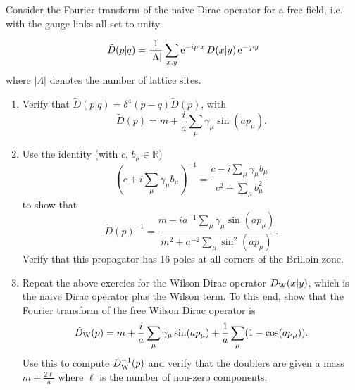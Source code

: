 Consider the Fourier transform of the naive Dirac operator for a free field, i.e. with the gauge links all set to unity 

\begin{equation}
    \tilde{D}(p|q) = \frac{1}{|\Lambda|} \sum_{x,y} {\rm e}^{-ip\cdot x} \, D(x|y) \, {\rm e}^{-q\cdot y} 
\end{equation} 
where $|\Lambda|$ denotes the number of lattice sites.
\begin{enumerate} 
	\item Verify that $\tilde{D}(p|q) = \delta^4(p-q) \tilde{D}(p)$, with 
		\begin{equation}
			\tilde{D}(p) = m + \frac{i}{a} \sum_{\mu} \gamma_\mu \sin(ap_\mu).  
		\end{equation}
	\item Use the identity (with $c,\, b_{\mu} \in \mathbb{R}$) 
		\begin{equation}
			\left( c + i\sum_{\mu} \gamma_\mu b_\mu \right)^{-1} = \frac{c - i\sum_\mu \gamma_\mu b_{\mu}}{c^2 + \sum_\mu b_\mu^2} 
		\end{equation}
		to show that 
		\begin{equation}
			\tilde{D}(p)^{-1} = \frac{m - ia^{-1}\sum_{\mu} \gamma_\mu \sin(ap_{\mu})}{m^2 + a^{-2}\sum_\mu \sin^{2}(ap_{\mu})}. 
		\end{equation}
    Verify that this propagator has 16 poles at all corners of the Brilloin zone.
    \item Repeat the above exercies for the Wilson Dirac operator $D_{\rm W}(x|y)$, which is the naive Dirac operator plus the Wilson term. To this end, show that the Fourier transform of the free Wilson Dirac operator is 
	    \begin{equation}
		    \tilde{D}_{\rm W}(p) = m + \frac{i}{a}\sum_{\mu} \gamma_{\mu}\sin(ap_\mu) + 
		    \frac{1}{a} \sum_{\mu} (1 - \cos(ap_\mu)). 
	    \end{equation}
		Use this to compute $\tilde{D}_{\rm W}^{-1}(p)$ and verify that the doublers are given a mass $m + \frac{2\ell}{a}$ where $\ell$ is the number of non-zero components. 
\end{enumerate}